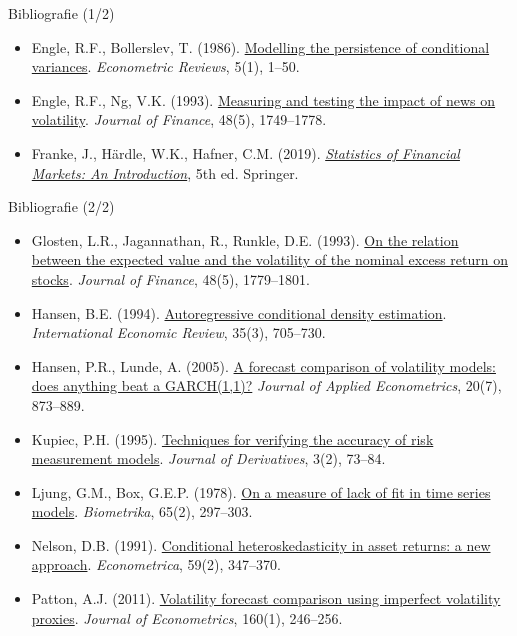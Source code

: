 \begin{frame}{Bibliografie (1/2)}
\begin{itemize}
    \item Engle, R.F., Bollerslev, T. (1986). \href{https://doi.org/10.1080/07474938608800095}{Modelling the persistence of conditional variances}. \textit{Econometric Reviews}, 5(1), 1--50.
    \item Engle, R.F., Ng, V.K. (1993). \href{https://doi.org/10.1111/j.1540-6261.1993.tb05127.x}{Measuring and testing the impact of news on volatility}. \textit{Journal of Finance}, 48(5), 1749--1778.
    \item Franke, J., Härdle, W.K., Hafner, C.M. (2019). \href{https://doi.org/10.1007/978-3-030-13751-9}{\textit{Statistics of Financial Markets: An Introduction}}, 5th ed. Springer.
\end{itemize}
\end{frame}

\begin{frame}{Bibliografie (2/2)}
\itemsize{\tiny}
\begin{itemize}
    \item Glosten, L.R., Jagannathan, R., Runkle, D.E. (1993). \href{https://doi.org/10.1111/j.1540-6261.1993.tb05128.x}{On the relation between the expected value and the volatility of the nominal excess return on stocks}. \textit{Journal of Finance}, 48(5), 1779--1801.
    \item Hansen, B.E. (1994). \href{https://doi.org/10.2307/2527081}{Autoregressive conditional density estimation}. \textit{International Economic Review}, 35(3), 705--730.
    \item Hansen, P.R., Lunde, A. (2005). \href{https://doi.org/10.1002/jae.800}{A forecast comparison of volatility models: does anything beat a GARCH(1,1)?} \textit{Journal of Applied Econometrics}, 20(7), 873--889.
    \item Kupiec, P.H. (1995). \href{https://doi.org/10.3905/jod.1995.407942}{Techniques for verifying the accuracy of risk measurement models}. \textit{Journal of Derivatives}, 3(2), 73--84.
    \item Ljung, G.M., Box, G.E.P. (1978). \href{https://doi.org/10.1093/biomet/65.2.297}{On a measure of lack of fit in time series models}. \textit{Biometrika}, 65(2), 297--303.
    \item Nelson, D.B. (1991). \href{https://doi.org/10.2307/2938260}{Conditional heteroskedasticity in asset returns: a new approach}. \textit{Econometrica}, 59(2), 347--370.
    \item Patton, A.J. (2011). \href{https://doi.org/10.1016/j.jeconom.2010.03.034}{Volatility forecast comparison using imperfect volatility proxies}. \textit{Journal of Econometrics}, 160(1), 246--256.

\end{itemize}
\end{frame}
